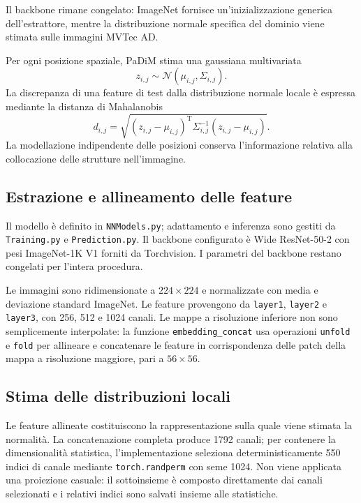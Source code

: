 Il backbone rimane congelato: ImageNet fornisce un'inizializzazione generica dell'estrattore, mentre la distribuzione normale specifica del dominio viene stimata sulle immagini MVTec AD.

Per ogni posizione spaziale, PaDiM stima una gaussiana multivariata
\begin{equation}
    z_{i,j} \sim \mathcal{N}(\mu_{i,j},\Sigma_{i,j}).
\end{equation}
La discrepanza di una feature di test dalla distribuzione normale locale è espressa mediante la distanza di Mahalanobis
\begin{equation}
    d_{i,j} = \sqrt{(z_{i,j}-\mu_{i,j})^{\mathrm{T}}
    \Sigma_{i,j}^{-1}(z_{i,j}-\mu_{i,j})}.
    \label{eq:cap3-padim-mahalanobis}
\end{equation}
La modellazione indipendente delle posizioni conserva l'informazione relativa alla collocazione delle strutture nell'immagine.

\subsection{Estrazione e allineamento delle feature}

Il modello è definito in \texttt{NNModels.py}; adattamento e inferenza sono gestiti da \texttt{Training.py} e \texttt{Prediction.py}. Il backbone configurato è Wide ResNet-50-2 con pesi ImageNet-1K V1 forniti da Torchvision. I parametri del backbone restano congelati per l'intera procedura.

Le immagini sono ridimensionate a $224\times224$ e normalizzate con media e deviazione standard ImageNet. Le feature provengono da \texttt{layer1}, \texttt{layer2} e \texttt{layer3}, con 256, 512 e 1024 canali. Le mappe a risoluzione inferiore non sono semplicemente interpolate: la funzione \texttt{embedding\_concat} usa operazioni \texttt{unfold} e \texttt{fold} per allineare e concatenare le feature in corrispondenza delle patch della mappa a risoluzione maggiore, pari a $56\times56$.

\subsection{Stima delle distribuzioni locali}

Le feature allineate costituiscono la rappresentazione sulla quale viene stimata la normalità. La concatenazione completa produce 1792 canali; per contenere la dimensionalità statistica, l'implementazione seleziona deterministicamente 550 indici di canale mediante \texttt{torch.randperm} con seme 1024. Non viene applicata una proiezione casuale: il sottoinsieme è composto direttamente dai canali selezionati e i relativi indici sono salvati insieme alle statistiche.

